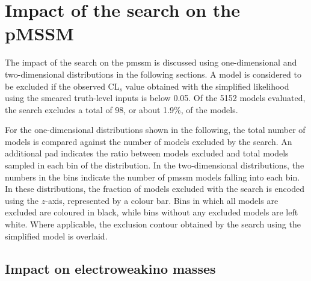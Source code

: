 \section{Impact of the search on the pMSSM}

The impact of the \onelepton search on the \gls{pmssm} is discussed using one-dimensional and two-dimensional distributions in the following sections. A model is considered to be excluded if the observed CL$_s$ value obtained with the simplified likelihood using the smeared truth-level inputs is below 0.05. Of the 5152 models evaluated, the \onelepton search excludes a total of 98, or about 1.9\%, of the models.

For the one-dimensional distributions shown in the following, the total number of models is compared against the number of models excluded by the \onelepton search. An additional pad indicates the ratio between models excluded and total models sampled in each bin of the distribution. In the two-dimensional distributions, the numbers in the bins indicate the number of \gls{pmssm} models falling into each bin. In these distributions, the fraction of models excluded with the \onelepton search is encoded using the $z$-axis, represented by a colour bar. Bins in which all models are excluded are coloured in black, while bins without any excluded models are left white. Where applicable, the exclusion contour obtained by the \onelepton search using the simplified model is overlaid.

\subsection{Impact on electroweakino masses}\label{sec:impact_electroweakino_masses}

